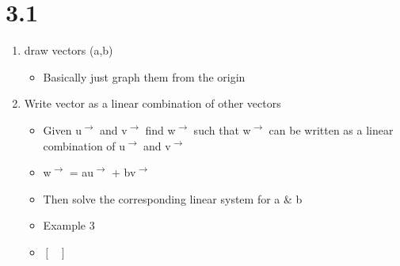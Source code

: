 \documentclass[letterpaper, 12pt]{article}
\begin{document}
\section{3.1}
\label{sec:orge6d2aab}
\begin{enumerate}
\item draw vectors (a,b)\\
\begin{itemize}
\item Basically just graph them from the origin\\
\end{itemize}
\item Write vector as a linear combination of other vectors\\
\begin{itemize}
\item Given u\textsuperscript{\(\rightarrow\)} and v\textsuperscript{\(\rightarrow\)} find w\textsuperscript{\(\rightarrow\)} such that w\textsuperscript{\(\rightarrow\)} can be written as a linear combination of u\textsuperscript{\(\rightarrow\)} and v\textsuperscript{\(\rightarrow\)}\\
\item w\textsuperscript{\(\rightarrow\)} = au\textsuperscript{\(\rightarrow\)} + bv\textsuperscript{\(\rightarrow\)}\\
\item Then solve the corresponding linear system for a \& b\\
\item Example 3\\
\item \(\begin{bmatrix}\end{bmatrix}\)\\
\end{itemize}
\end{enumerate}
\end{document}
